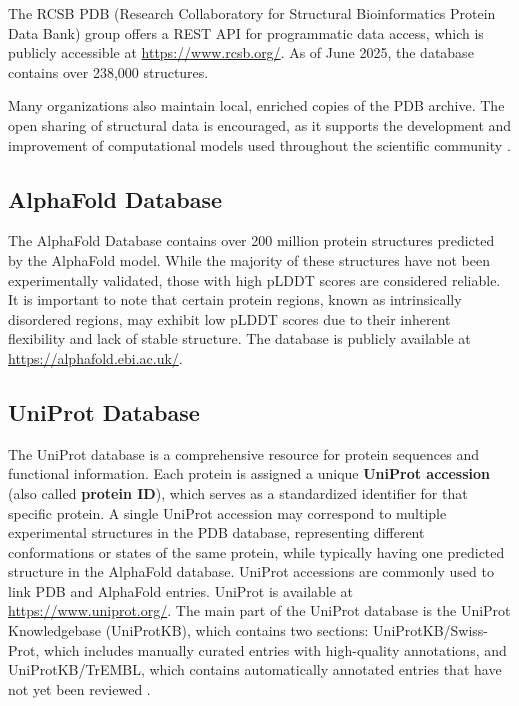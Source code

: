 The RCSB PDB (Research Collaboratory for Structural Bioinformatics Protein Data Bank) group offers a REST API for programmatic data access, which is publicly accessible at \url{https://www.rcsb.org/}. As of June 2025, the database contains over 238,000 structures.

Many organizations also maintain local, enriched copies of the PDB archive. The open sharing of structural data is encouraged, as it supports the development and improvement of computational models used throughout the scientific community \cite{callaway2025alphafold}.

\subsection{AlphaFold Database}
\label{sec:alphafold-db}

The AlphaFold Database \cite{varadi2024alphafold} contains over 200 million protein structures predicted by the AlphaFold model. While the majority of these structures have not been experimentally validated, those with high pLDDT scores are considered reliable. It is important to note that certain protein regions, known as intrinsically disordered regions, may exhibit low pLDDT scores due to their inherent flexibility and lack of stable structure. The database is publicly available at \url{https://alphafold.ebi.ac.uk/}.

\subsection{UniProt Database}
\label{sec:uniprot-db}

The UniProt database \cite{uniprot2025uniprot} is a comprehensive resource for protein sequences and functional information. Each protein is assigned a unique \textbf{UniProt accession} (also called \textbf{protein ID}), which serves as a standardized identifier for that specific protein. A single UniProt accession may correspond to multiple experimental structures in the PDB database, representing different conformations or states of the same protein, while typically having one predicted structure in the AlphaFold database. UniProt accessions are commonly used to link PDB and AlphaFold entries. UniProt is available at \url{https://www.uniprot.org/}. The main part of the UniProt database is the UniProt Knowledgebase (UniProtKB), which contains two sections: UniProtKB/Swiss-Prot, which includes manually curated entries with high-quality annotations, and UniProtKB/TrEMBL, which contains automatically annotated entries that have not yet been reviewed \cite{boutet2016uniprotkb}.

